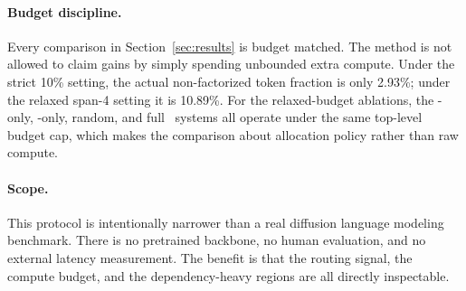 \paragraph{Budget discipline.}
Every comparison in Section~\ref{sec:results} is budget matched. The method is not allowed to claim gains by simply spending unbounded extra compute. Under the strict 10\% setting, the actual non-factorized token fraction is only 2.93\%; under the relaxed span-4 setting it is 10.89\%.
For the relaxed-budget ablations, the \coupled-only, \micro-only, random, and full \method\ systems all operate under the same top-level budget cap, which makes the comparison about allocation policy rather than raw compute.

\begin{table}[t]
\centering
\caption{Main synthetic runs. The two-mode 10\% system already improves over fully factorized decoding, and the relaxed span-4 \method\ run improves further while still using non-factorized handling on a minority of tokens.}
\label{tab:main}

\end{table}

\paragraph{Scope.}
This protocol is intentionally narrower than a real diffusion language modeling benchmark. There is no pretrained backbone, no human evaluation, and no external latency measurement. The benefit is that the routing signal, the compute budget, and the dependency-heavy regions are all directly inspectable.
